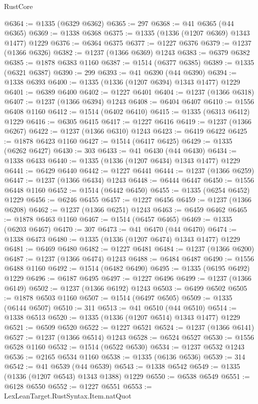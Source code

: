 \begin{lexlean}{RustCore}
\begin{coremodule}
@6364 := @1335 (@6329 @6362)
@6365 := 297
@6368 := @41 @6365 (@44 @6365)
@6369 := @1338 @6368
@6375 := @1335 (@1336 (@1207 @6369) @1343 @1477) @1229
@6376 := @6364 @6375
@6377 := @1227 @6376
@6379 := @1237 (@1366 @6326)
@6382 := @1237 (@1366 @6369) @1243
@6383 := @6379 @6382
@6385 := @1878 @6383 @1160
@6387 := @1514 (@6377 @6385)
@6389 := @1335 (@6321 @6387)
@6390 := 299
@6393 := @41 @6390 (@44 @6390)
@6394 := @1338 @6393
@6400 := @1335 (@1336 (@1207 @6394) @1343 @1477) @1229
@6401 := @6389 @6400
@6402 := @1227 @6401
@6404 := @1237 (@1366 @6318)
@6407 := @1237 (@1366 @6394) @1243
@6408 := @6404 @6407
@6410 := @1556 @6408 @1160
@6412 := @1514 (@6402 @6410)
@6415 := @1335 (@6313 @6412) @1229
@6416 := @6305 @6415
@6417 := @1227 @6416
@6419 := @1237 (@1366 @6267)
@6422 := @1237 (@1366 @6310) @1243
@6423 := @6419 @6422
@6425 := @1878 @6423 @1160
@6427 := @1514 (@6417 @6425)
@6429 := @1335 (@6262 @6427)
@6430 := 303
@6433 := @41 @6430 (@44 @6430)
@6434 := @1338 @6433
@6440 := @1335 (@1336 (@1207 @6434) @1343 @1477) @1229
@6441 := @6429 @6440
@6442 := @1227 @6441
@6444 := @1237 (@1366 @6259)
@6447 := @1237 (@1366 @6434) @1243
@6448 := @6444 @6447
@6450 := @1556 @6448 @1160
@6452 := @1514 (@6442 @6450)
@6455 := @1335 (@6254 @6452) @1229
@6456 := @6246 @6455
@6457 := @1227 @6456
@6459 := @1237 (@1366 @6208)
@6462 := @1237 (@1366 @6251) @1243
@6463 := @6459 @6462
@6465 := @1878 @6463 @1160
@6467 := @1514 (@6457 @6465)
@6469 := @1335 (@6203 @6467)
@6470 := 307
@6473 := @41 @6470 (@44 @6470)
@6474 := @1338 @6473
@6480 := @1335 (@1336 (@1207 @6474) @1343 @1477) @1229
@6481 := @6469 @6480
@6482 := @1227 @6481
@6484 := @1237 (@1366 @6200)
@6487 := @1237 (@1366 @6474) @1243
@6488 := @6484 @6487
@6490 := @1556 @6488 @1160
@6492 := @1514 (@6482 @6490)
@6495 := @1335 (@6195 @6492) @1229
@6496 := @6187 @6495
@6497 := @1227 @6496
@6499 := @1237 (@1366 @6149)
@6502 := @1237 (@1366 @6192) @1243
@6503 := @6499 @6502
@6505 := @1878 @6503 @1160
@6507 := @1514 (@6497 @6505)
@6509 := @1335 (@6144 @6507)
@6510 := 311
@6513 := @41 @6510 (@44 @6510)
@6514 := @1338 @6513
@6520 := @1335 (@1336 (@1207 @6514) @1343 @1477) @1229
@6521 := @6509 @6520
@6522 := @1227 @6521
@6524 := @1237 (@1366 @6141)
@6527 := @1237 (@1366 @6514) @1243
@6528 := @6524 @6527
@6530 := @1556 @6528 @1160
@6532 := @1514 (@6522 @6530)
@6534 := @1237 @6532 @1243
@6536 := @2165 @6534 @1160
@6538 := @1335 (@6136 @6536)
@6539 := 314
@6542 := @41 @6539 (@44 @6539)
@6543 := @1338 @6542
@6549 := @1335 (@1336 (@1207 @6543) @1343 @1388) @1229
@6550 := @6538 @6549
@6551 := @6128 @6550
@6552 := @1227 @6551
@6553 := LexLeanTarget.RustSyntax.Item.natQuot

\end{coremodule}
\end{lexlean}
